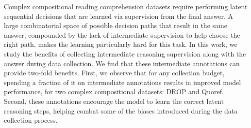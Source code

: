 Complex compositional reading comprehension datasets require performing latent sequential decisions that are learned via supervision from the final answer. A large combinatorial space of possible decision paths that result in the same answer, compounded by the lack of intermediate supervision to help choose the right path, makes the learning particularly hard for this task. In this work, we study the benefits of collecting intermediate reasoning supervision along with the answer during data collection. We find that these intermediate annotations can provide two-fold benefits. First, we observe that for any collection budget, spending a fraction of it on intermediate annotations results in improved model performance, for two complex compositional datasets: DROP and Quoref. Second, these annotations encourage the model to learn the correct latent reasoning steps, helping combat some of the biases introduced during the data collection process.
